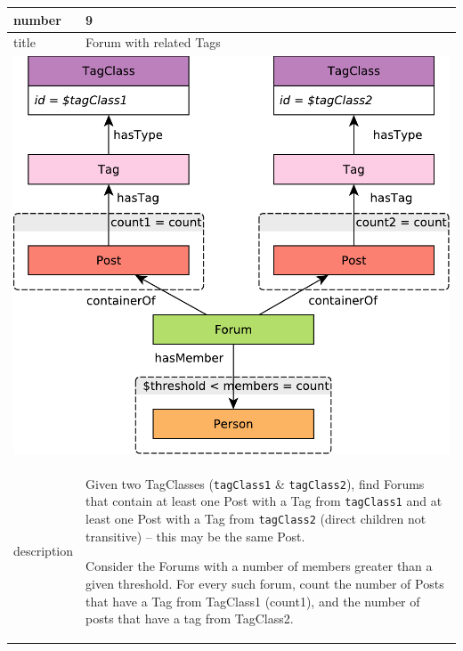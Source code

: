 \renewcommand*{\arraystretch}{1.1}

\noindent\begin{tabularx}{17cm}{|p{1.95cm}|X|}
	\hline
	number      & 9                                                          \\ \hline
%
	title       & Forum with related Tags                                                           \\ \hline
	\multicolumn{2}{|c|}{ \includegraphics[scale=\patternscale,margin=0cm .2cm]{patterns/q09}} \\ \hline
	description & Given two TagClasses (\texttt{tagClass1} \& \texttt{tagClass2}), find
Forums that contain at least one Post with a Tag from \texttt{tagClass1}
and at least one Post with a Tag from \texttt{tagClass2} (direct
children not transitive) -- this may be the same Post.

Consider the Forums with a number of members greater than a given
threshold. For every such forum, count the number of Posts that have a
Tag from TagClass1 (count1), and the number of posts that have a tag
from TagClass2.
 \\ \hline
	

\end{tabularx}
